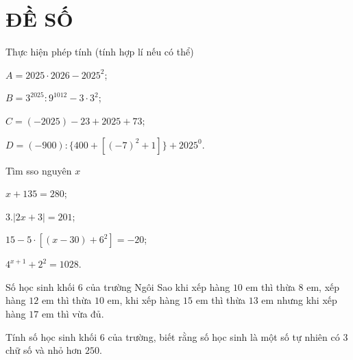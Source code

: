 
\section{ĐỀ SỐ \thesection } %
\setcounter{bt}{0}
\begin{bt} Thực hiện phép tính (tính hợp lí nếu có thể)
	\begin{listEX}[2]
		\item  $A=2025\cdot2026-2025^2$;
        \item $B=3^{2025}:9^{1012}-3\cdot3^2$;
        \item $C=(-2025)-23 +2025+73$;
        \item $D=( -900): \{400+[ (-7)^2+ 1]\} +2025^0$.
	\end{listEX}

	
\end{bt}

\begin{bt} Tìm sso nguyên $x$
	\begin{listEX}[2]
		\item  $ x+135=280$;
		\item $3.|2x+3|=201$;
        \item $ 15-5\cdot[(x-30)+6^2]=-20$;
        \item $4^{x+1}+2^2=1028.
$
	\end{listEX}
\end{bt}



\begin{bt}%
	Số học sinh khối 6 của trường Ngôi Sao khi xếp hàng $10$ em thì thừa $8$ em,  
	xếp hàng $12$ em thì thừa $10$ em,  
	khi xếp hàng $15$ em thì thừa $13$ em nhưng khi xếp hàng $17$ em thì vừa đủ.  
	
	Tính số học sinh khối 6 của trường, biết rằng số học sinh là một số tự nhiên có $3$ chữ số và nhỏ hơn $250$.
\end{bt}

